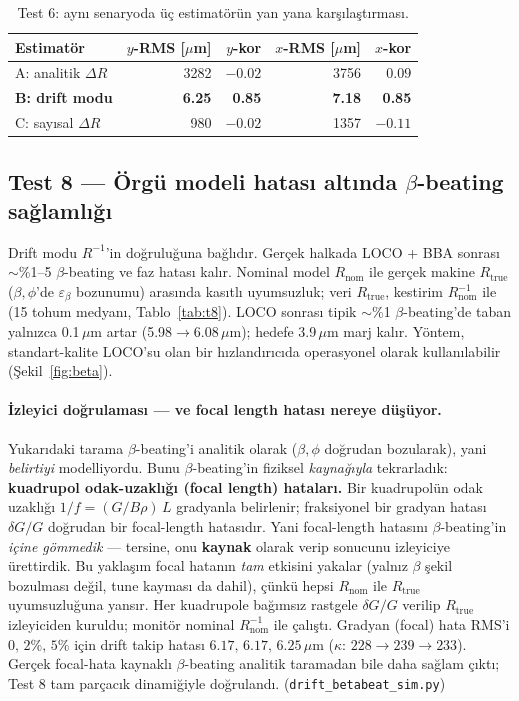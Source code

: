 \documentclass[twocolumn,a4paper,10pt]{article}
\begin{document}
\begin{table}[tb]
\centering
\caption{Test 6: aynı senaryoda üç estimatörün yan yana karşılaştırması.}
\label{tab:t6}
\begin{tabular}{@{}lrrrr@{}}
\toprule
Estimatör & $y$-RMS [$\mu$m] & $y$-kor & $x$-RMS [$\mu$m] & $x$-kor \\
\midrule
A: analitik $\Delta R$        & 3282 & $-0.02$ & 3756 & $0.09$ \\
\textbf{B: drift modu}        & \textbf{6.25} & \textbf{0.85} & \textbf{7.18} & \textbf{0.85} \\
C: sayısal $\Delta R$         & 980  & $-0.02$ & 1357 & $-0.11$ \\
\bottomrule
\end{tabular}
\end{table}

\subsection{Test 8 --- Örgü modeli hatası altında $\beta$-beating sağlamlığı}
Drift modu $R^{-1}$'in doğruluğuna bağlıdır. Gerçek halkada LOCO + BBA sonrası
$\sim$\%1--5 $\beta$-beating ve faz hatası kalır. Nominal model
$R_\text{nom}$ ile gerçek makine $R_\text{true}$ ($\beta,\phi$'de
$\varepsilon_\beta$ bozunumu) arasında kasıtlı uyumsuzluk; veri
$R_\text{true}$, kestirim $R_\text{nom}^{-1}$ ile (15 tohum medyanı,
Tablo~\ref{tab:t8}). LOCO sonrası tipik $\sim$\%1 $\beta$-beating'de taban
yalnızca 0.1\,$\mu$m artar (5.98$\to$6.08\,$\mu$m); hedefe 3.9\,$\mu$m marj
kalır. Yöntem, standart-kalite LOCO'su olan bir hızlandırıcıda operasyonel
olarak kullanılabilir (Şekil~\ref{fig:beta}).

\paragraph{İzleyici doğrulaması --- ve focal length hatası nereye düşüyor.}
Yukarıdaki tarama $\beta$-beating'i analitik olarak ($\beta,\phi$ doğrudan
bozularak), yani \emph{belirtiyi} modelliyordu. Bunu $\beta$-beating'in fiziksel
\emph{kaynağıyla} tekrarladık: \textbf{kuadrupol odak-uzaklığı (focal length)
hataları.} Bir kuadrupolün odak uzaklığı $1/f=(G/B\rho)\,L$ gradyanla belirlenir;
fraksiyonel bir gradyan hatası $\delta G/G$ doğrudan bir focal-length hatasıdır.
Yani focal-length hatasını $\beta$-beating'in \emph{içine gömmedik} --- tersine,
onu \textbf{kaynak} olarak verip sonucunu izleyiciye ürettirdik. Bu yaklaşım
focal hatanın \emph{tam} etkisini yakalar (yalnız $\beta$ şekil bozulması değil,
tune kayması da dahil), çünkü hepsi $R_\text{nom}$ ile $R_\text{true}$
uyumsuzluğuna yansır. Her kuadrupole bağımsız rastgele $\delta G/G$ verilip
$R_\text{true}$ izleyiciden kuruldu; monitör nominal $R_\text{nom}^{-1}$ ile
çalıştı. Gradyan (focal) hata RMS'i $0,\,2\%,\,5\%$ için drift takip hatası
$6.17,\,6.17,\,6.25\,\mu$m ($\kappa$: $228\to239\to233$). Gerçek focal-hata
kaynaklı $\beta$-beating analitik taramadan bile daha sağlam çıktı; Test 8 tam
parçacık dinamiğiyle doğrulandı. (\texttt{drift\_betabeat\_sim.py})
\end{document}
